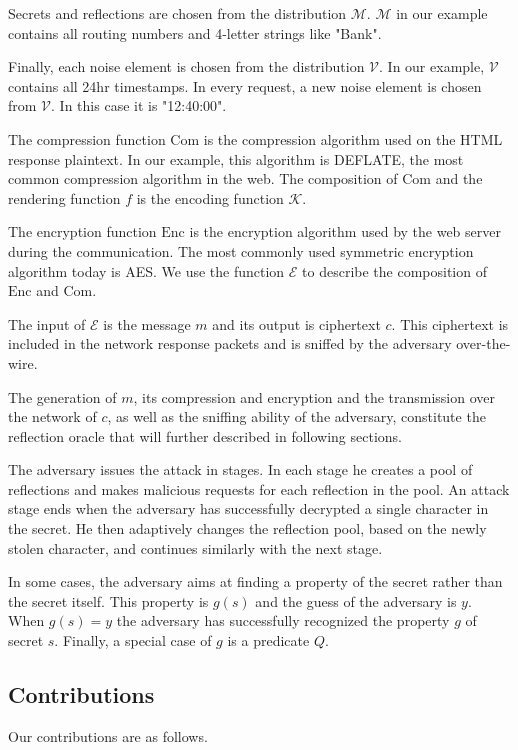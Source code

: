 \documentclass[conference, letterpaper, 10pt]{IEEEtran}
\begin{document}
Secrets and reflections are chosen from the distribution $\mathcal{M}$.
$\mathcal{M}$ in our example contains all routing numbers and 4-letter strings
like "Bank".

Finally, each noise element is chosen from the distribution $\mathcal{V}$. In
our example, $\mathcal{V}$ contains all 24hr timestamps. In every request, a new
noise element is chosen from $\mathcal{V}$. In this case it is "12:40:00".

The compression function $\textrm{Com}$ is the compression algorithm used on the
HTML response plaintext. In our example, this algorithm is DEFLATE, the most
common compression algorithm in the web. The composition of $\textrm{Com}$ and
the rendering function $f$ is the encoding function $\mathcal{K}$.

The encryption function $\textrm{Enc}$ is the encryption algorithm used by the
web server during the communication. The most commonly used symmetric encryption
algorithm today is AES. We use the function $\mathcal{E}$ to describe the
composition of $\textrm{Enc}$ and $\textrm{Com}$.

The input of $\mathcal{E}$ is the message $m$ and its output is ciphertext $c$.
This ciphertext is included in the network response packets and is sniffed by
the adversary over-the-wire.

The generation of $m$, its compression and encryption and the transmission over
the network of $c$, as well as the sniffing ability of the adversary, constitute
the reflection oracle that will further described in following sections.

The adversary issues the attack in stages. In each stage he creates a pool of
reflections and makes malicious requests for each reflection in the pool. An
attack stage ends when the adversary has successfully decrypted a single
character in the secret. He then adaptively changes the reflection pool, based
on the newly stolen character, and continues similarly with the next stage.

In some cases, the adversary aims at finding a property of the secret rather
than the secret itself. This property is $g(s)$ and the guess of the adversary
is $y$. When $g(s) = y$ the adversary has successfully recognized the property
$g$ of secret $s$. Finally, a special case of $g$ is a predicate $Q$.

\subsection{Contributions}
Our contributions are as follows.
\end{document}
